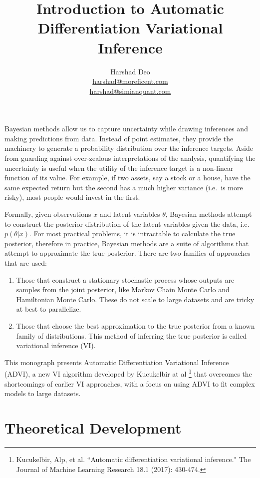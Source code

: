 \documentclass[12pt]{article}
\title{Introduction to Automatic Differentiation Variational Inference}
\author{Harshad Deo \\ 
  \href{mailto:harshad@moreficent.com}{harshad@moreficent.com} \\ 
  \href{mailto:harshad@simianquant.com}{harshad@simianquant.com}
}
\date{}
\begin{document}
  
\maketitle

Bayesian methods allow us to capture uncertainty while drawing inferences and making predictions from data. Instead of 
point estimates, they provide the machinery to generate a probability distribution over the inference targets. Aside from 
guarding against over-zealous interpretations of the analysis, quantifying the uncertainty is useful when the utility of 
the inference target is a non-linear function of its value. For example, if two assets, say a stock or a house, have the
same expected return but the second has a much higher variance (i.e.\ is more risky), most people would invest in the 
first. 

Formally, given observations $x$ and latent variables $\theta$, Bayesian methods attempt to construct the posterior 
distribution of the latent variables given the data, i.e.\ $p(\theta|x)$. For most practical problems, it is intractable 
to calculate the true posterior, therefore in practice, Bayesian methods are a suite of algorithms that attempt to 
approximate the true posterior. There are two families of approaches that are used:

\begin{enumerate}
  \item Those that construct a stationary stochastic process whose outputs are samples from the joint posterior, like 
    Markov Chain Monte Carlo and Hamiltonian Monte Carlo. These do not scale to large datasets and are tricky at 
    best to parallelize.
  \item Those that choose the best approximation to the true posterior from a known family of distributions. This method 
    of inferring the true posterior is called variational inference (VI).
\end{enumerate}

This monograph presents Automatic Differentiation Variational Inference (ADVI), a new VI algorithm
developed by Kucukelbir at al \footnote{Kucukelbir, Alp, et al. ``Automatic differentiation variational inference." 
The Journal of Machine Learning Research 18.1 (2017): 430-474.} that overcomes the shortcomings of earlier VI approaches,
with a focus on using ADVI to fit complex models to large datasets. 

\section*{Theoretical Development}
\end{document}

